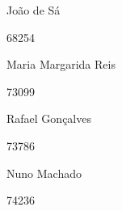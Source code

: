 \documentclass[a4paper,11pt]{article}
\begin{document}

	
	
	
	\trSetAuthors
	{
		\begin{center}
			João de Sá

			68254
		\end{center}
	}{
		\begin{center}
			Maria Margarida Reis

			73099
		\end{center}
	}{
		\begin{center}
			Rafael Gonçalves

			73786
		\end{center}
	}{
		\begin{center}
			Nuno Machado

			74236
		\end{center}
	}
		
	
	\trMakeCover
	
	\tableofcontents
	\pagebreak
	
	
\end{document}

